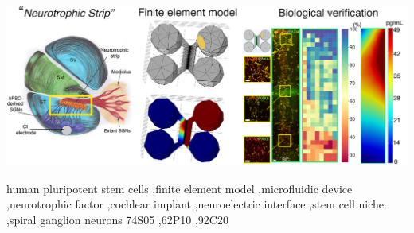 \documentclass[review]{elsarticle}
\begin{document}
\begin{frontmatter}
\begin{graphicalabstract}
	\\
	\\
	\\
	\includegraphics[width=\textwidth]{Graphical_Abstract.jpg}
\end{graphicalabstract}

\begin{keyword}
	human pluripotent stem cells \sep finite element model \sep microfluidic device \sep neurotrophic factor \sep cochlear implant \sep neuroelectric interface \sep stem cell niche \sep spiral ganglion neurons
	\MSC[2010] 74S05 \sep 62P10 \sep 92C20 %
\end{keyword}

\end{frontmatter}
\newpage

\linenumbers

\linenumbers
\clearpage
{}
\end{document}
